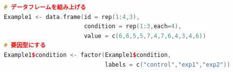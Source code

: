 \begin{lstlisting}[language=c++,label={code:23_05},caption={データの準備}]
# データフレームを組み上げる
Example1 <- data.frame(id = rep(1:4,3),
                       condition = rep(1:3,each=4),
                       value = c(6,6,5,5,7,4,7,6,4,3,4,6))
# 要因型にする
Example1$condition <- factor(Example1$condition,
                             labels = c("control","exp1","exp2"))\end{lstlisting}
